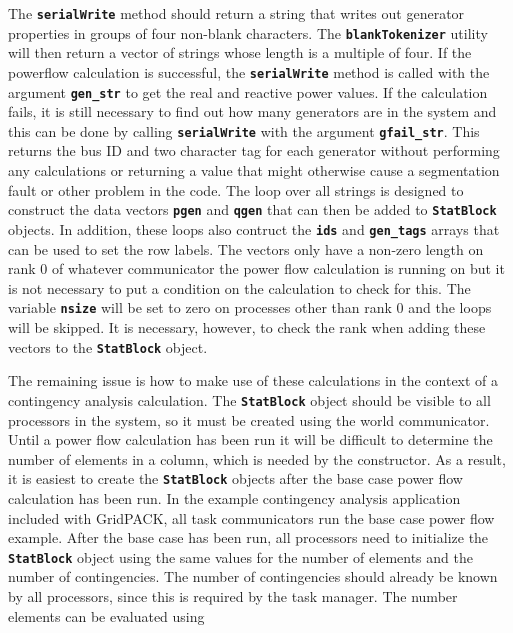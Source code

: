 \documentclass[12pt]{report} %
\begin{document}
The \texttt{\textbf{serialWrite}} method should return a string that writes out generator properties in groups of four non-blank characters. The \texttt{\textbf{blankTokenizer}} utility will then return a vector of strings whose length is a multiple of four. If the powerflow calculation is successful, the \texttt{\textbf{serialWrite}} method is called with the argument \texttt{\textbf{gen\_str}} to get the real and reactive power values. If the calculation fails, it is still necessary to find out how many generators are in the system and this can be done by calling \texttt{\textbf{serialWrite}} with the argument \texttt{\textbf{gfail\_str}}. This returns the bus ID and two character tag for each generator without performing any calculations or returning a value that might otherwise cause a segmentation fault or other problem in the code. The loop over all strings is designed to construct the data vectors \texttt{\textbf{pgen}} and \texttt{\textbf{qgen}} that can then be added to \texttt{\textbf{StatBlock}} objects. In addition, these loops also contruct the \texttt{\textbf{ids}} and \texttt{\textbf{gen\_tags}} arrays that can be used to set the row labels. The vectors only have a non-zero length on rank 0 of whatever communicator the power flow calculation is running on but it is not necessary to put a condition on the calculation to check for this. The variable \texttt{\textbf{nsize}} will be set to zero on processes other than rank 0 and the loops will be skipped. It is necessary, however, to check the rank when adding these vectors to the \texttt{\textbf{StatBlock}} object.

The remaining issue is how to make use of these calculations in the context of a contingency analysis calculation. The \texttt{\textbf{StatBlock}} object should be visible to all processors in the system, so it must be created using the world communicator. Until a power flow calculation has been run it will be difficult to determine the number of elements in a column, which is needed by the constructor. As a result, it is easiest to create the \texttt{\textbf{StatBlock}} objects after the base case power flow calculation has been run. In the example contingency analysis application included with GridPACK, all task communicators run the base case power flow example. After the base case has been run, all processors need to initialize the \texttt{\textbf{StatBlock}} object using the same values for the number of elements and the number of contingencies. The number of contingencies should already be known by all processors, since this is required by the task manager. The number elements can be evaluated using
\end{document}
